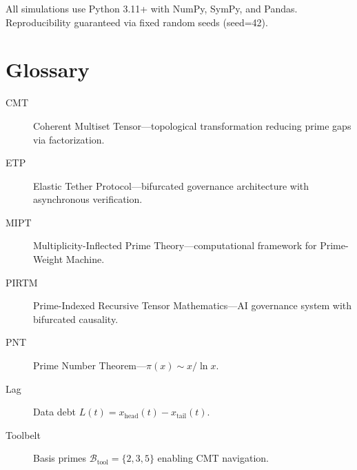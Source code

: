 \documentclass[12pt,a4paper]{article}
\begin{document}
All simulations use Python 3.11+ with NumPy, SymPy, and Pandas. Reproducibility guaranteed via fixed random seeds (seed=42).

\section{Glossary}

\begin{description}
\item[CMT] Coherent Multiset Tensor—topological transformation reducing prime gaps via factorization.
\item[ETP] Elastic Tether Protocol—bifurcated governance architecture with asynchronous verification.
\item[MIPT] Multiplicity-Inflected Prime Theory—computational framework for Prime-Weight Machine.
\item[PIRTM] Prime-Indexed Recursive Tensor Mathematics—AI governance system with bifurcated causality.
\item[PNT] Prime Number Theorem—$\pi(x) \sim x / \ln x$.
\item[Lag] Data debt $L(t) = x_{\text{head}}(t) - x_{\text{tail}}(t)$.
\item[Toolbelt] Basis primes $\mathcal{B}_{\text{tool}} = \{2, 3, 5\}$ enabling CMT navigation.
\end{description}
\end{document}
